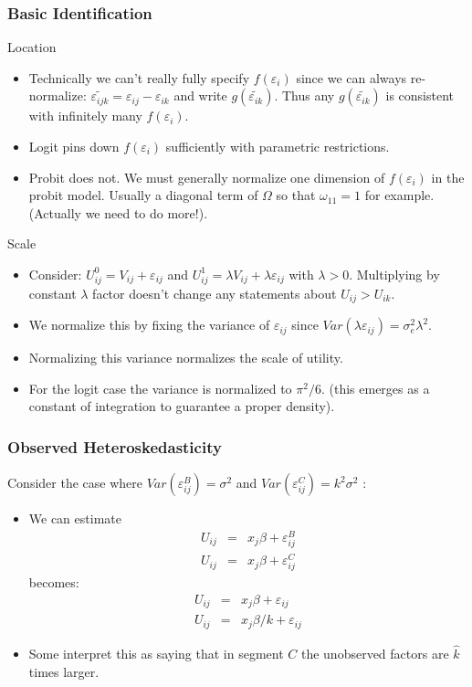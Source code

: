 \documentclass[xcolor=pdftex,dvipsnames,table,mathserif]{beamer}
\begin{document}
\begin{frame}
\frametitle{Basic Identification}
Location
\begin{itemize}
\item Technically we can't really fully specify $f(\varepsilon_i)$ since we can always re-normalize: $\widetilde{\varepsilon_{ijk}} = \varepsilon_{ij} - \varepsilon_{ik}$ and write $g(\widetilde{\varepsilon_{ik}})$. Thus any $g(\widetilde{\varepsilon_{ik}})$ is consistent with infinitely many $f(\varepsilon_i)$.
\item Logit pins down $f(\varepsilon_i)$ sufficiently with parametric restrictions.
\item Probit does not. We must generally normalize one dimension of $f(\varepsilon_i)$ in the probit model. Usually a diagonal term of $\Omega$ so that $\omega_{11} =1$ for example. (Actually we need to do more!).
\end{itemize}
Scale
\begin{itemize}
\item Consider: $U_{ij}^0 = V_{ij} + \varepsilon_{ij}$ and  $U_{ij}^1 = \lambda V_{ij} + \lambda \varepsilon_{ij}$ with $\lambda > 0$. Multiplying by constant $\lambda$ factor doesn't change any statements about $U_{ij} > U_{ik}$.
\item We normalize this by fixing the variance of $\varepsilon_{ij}$ since $Var(\lambda \varepsilon_{ij} ) = \sigma_e^2 \lambda^2$.
\item Normalizing this variance normalizes the scale of utility.
\item For the logit case the variance is normalized to $\pi^2/6$. (this emerges as a constant of integration to guarantee a proper density).
\end{itemize}
\end{frame}

\begin{frame}
\frametitle{Observed Heteroskedasticity}
Consider the case where $Var(\varepsilon_{ij}^B) = \sigma^2$ and   $Var(\varepsilon_{ij}^C) =  k^2 \sigma^2$ :
\begin{itemize}
\item We can estimate
\begin{eqnarray*}
U_{ij} &=& x_j \beta + \varepsilon_{ij}^B\\
U_{ij} &=& x_j \beta + \varepsilon_{ij}^C
\end{eqnarray*}
becomes:
\begin{eqnarray*}
U_{ij} &=& x_j \beta + \varepsilon_{ij}\\
U_{ij} &=& x_j \beta/k+ \varepsilon_{ij}
\end{eqnarray*}
\item Some interpret this as saying that in segment $C$ the unobserved factors are $\hat{k}$ times larger.
\end{itemize}
\end{frame}
\end{document}
